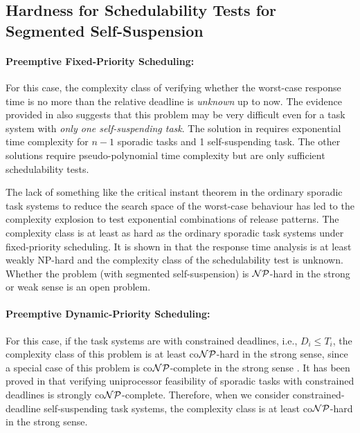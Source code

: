 \subsection{Hardness for Schedulability Tests for Segmented Self-Suspension}
\paragraph{Preemptive Fixed-Priority Scheduling:}   
For this case, the complexity class of verifying whether the worst-case response time is no more than the relative deadline is \emph{unknown} up to now. The evidence provided in \cite{ecrts15nelissen} also suggests that this problem may be very difficult even for a task system with \emph{only one self-suspending task}. The solution in \cite{ecrts15nelissen}  requires exponential time complexity for $n-1$ sporadic tasks and 1 self-suspending task. The other solutions \cite{Huang:multiseg}\cite{PH:rtss98} require pseudo-polynomial time complexity but are only sufficient schedulability tests.

The lack of something like the critical instant theorem in the ordinary sporadic task systems to reduce the search space of the worst-case behaviour has led to the complexity explosion to test exponential combinations of release patterns. The complexity class is at least as hard as the ordinary sporadic task systems under fixed-priority scheduling. It is shown in \cite{EisenbrandR08} that the response time analysis is at least weakly NP-hard and the complexity class of the schedulability test is unknown.
Whether the problem (with segmented self-suspension) is ${\cal NP}$-hard in the strong or weak sense is an open problem.

\paragraph{Preemptive Dynamic-Priority Scheduling:} 
For this case, if the task systems are with constrained deadlines, i.e., $D_i \leq T_i$, the complexity class of this problem is at least co${\cal NP}$-hard in the strong sense, since a special case of this problem is co${\cal NP}$-complete in the strong sense \cite{DBLP:conf/ecrts/Ekberg015}. It has been proved in \cite{DBLP:conf/ecrts/Ekberg015} that verifying uniprocessor feasibility of sporadic tasks with constrained deadlines is strongly co${\cal NP}$-complete.  Therefore, when we consider constrained-deadline self-suspending task systems, the complexity class is at least co${\cal NP}$-hard in the strong sense.

